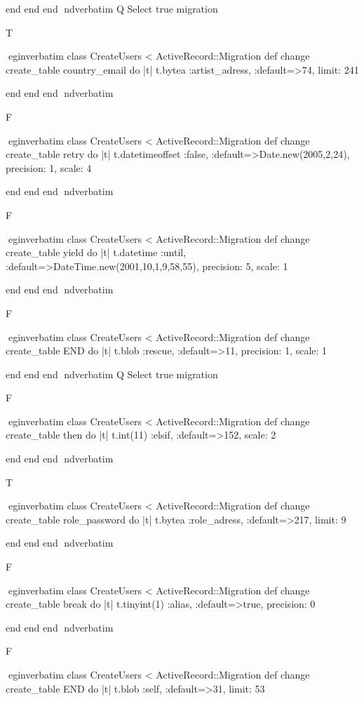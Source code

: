     end 
  end 
end
nd{verbatim}
Q
 Select true migration

T

egin{verbatim}
 class CreateUsers < ActiveRecord::Migration 
  def change 
    create_table country_email do |t| 
      t.bytea :artist_adress, :default=>74, limit: 241
    
    end 
  end 
end
nd{verbatim}

F

egin{verbatim}
 class CreateUsers < ActiveRecord::Migration 
  def change 
    create_table retry do |t| 
      t.datetimeoffset :false, :default=>Date.new(2005,2,24), precision: 1, scale: 4
    
    end 
  end 
end
nd{verbatim}

F

egin{verbatim}
 class CreateUsers < ActiveRecord::Migration 
  def change 
    create_table yield do |t| 
      t.datetime :until, :default=>DateTime.new(2001,10,1,9,58,55), precision: 5, scale: 1
    
    end 
  end 
end
nd{verbatim}

F

egin{verbatim}
 class CreateUsers < ActiveRecord::Migration 
  def change 
    create_table END do |t| 
      t.blob :rescue, :default=>11, precision: 1, scale: 1
    
    end 
  end 
end
nd{verbatim}
Q
 Select true migration

F

egin{verbatim}
 class CreateUsers < ActiveRecord::Migration 
  def change 
    create_table then do |t| 
      t.int(11) :elsif, :default=>152, scale: 2
    
    end 
  end 
end
nd{verbatim}

T

egin{verbatim}
 class CreateUsers < ActiveRecord::Migration 
  def change 
    create_table role_password do |t| 
      t.bytea :role_adress, :default=>217, limit: 9
    
    end 
  end 
end
nd{verbatim}

F

egin{verbatim}
 class CreateUsers < ActiveRecord::Migration 
  def change 
    create_table break do |t| 
      t.tinyint(1) :alias, :default=>true, precision: 0
    
    end 
  end 
end
nd{verbatim}

F

egin{verbatim}
 class CreateUsers < ActiveRecord::Migration 
  def change 
    create_table END do |t| 
      t.blob :self, :default=>31, limit: 53
    

